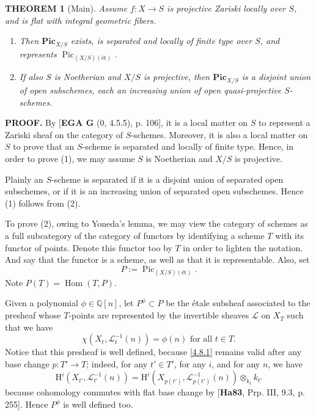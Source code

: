 \documentclass{article}
\newcommand{\Pic}{\mathbf{Pic}}
\newcommand{\pPic}{\operatorname{Pic}}
\newcommand{\et}{\text{ét}}
\newtheorem{theorem}{THEOREM}[section]
\begin{document}
\begin{theorem}[Main]
Assume $f : X \to S$ is projective Zariski locally over $S$, and is flat with integral geometric fibers.
\begin{enumerate}
    \item Then $\Pic_{X/S}$ exists, is separated and locally of finite type over $S$, and represents $\pPic_{(X/S)(\et)}$.
    \item If also $S$ is Noetherian and $X/S$ is projective, then $\Pic_{X/S}$ is a disjoint union of open subschemes, each an increasing union of open quasi-projective $S$-schemes.
\end{enumerate}
\end{theorem}

\noindent\textbf{PROOF.} By [\textbf{EGA G} (0, 4.5.5), p. 106], it is a local matter on $S$ to represent a Zariski sheaf on the category of $S$-schemes. Moreover, it is also a local matter on $S$ to prove that an $S$-scheme is separated and locally of finite type. Hence, in order to prove (1), we may assume $S$ is Noetherian and $X/S$ is projective.

Plainly an $S$-scheme is separated if it is a disjoint union of separated open subschemes, or if it is an increasing union of separated open subschemes. Hence (1) follows from (2).

To prove (2), owing to Yoneda's lemma, we may view the category of schemes as a full subcategory of the category of functors by identifying a scheme $T$ with its functor of points. Denote this functor too by $T$ in order to lighten the notation. And say that the functor is a scheme, as well as that it is representable. Also, set
\[
P := \pPic_{(X/S)(\et)}.
\]
Note $P(T) = \operatorname{Hom}(T, P)$.

Given a polynomial $\phi \in \mathbb{Q}[n]$, let $P^{\phi} \subset P$ be the \'{e}tale subsheaf associated to the presheaf whose $T$-points are represented by the invertible sheaves $\mathcal{L}$ on $X_T$ such that we have
\begin{equation}\label{4.8.1}
\chi(X_t, \mathcal{L}_t^{-1}(n)) = \phi(n) \text{ for all } t \in T.
\end{equation}
Notice that this presheaf is well defined, because \eqref{4.8.1} remains valid after any base change $p: T' \to T$; indeed, for any $t' \in T'$, for any $i$, and for any $n$, we have
\[
\mathrm{H}^i(X_{t'}, \mathcal{L}_{t'}^{-1}(n)) = \mathrm{H}^i(X_{p(t')}, \mathcal{L}_{p(t')}^{-1}(n)) \otimes_{k_t} k_{t'}
\]
because cohomology commutes with flat base change by [\textbf{Ha83}, Prp. III, 9.3, p. 255]. Hence $P^{\phi} $ is well defined too.
\end{document}
